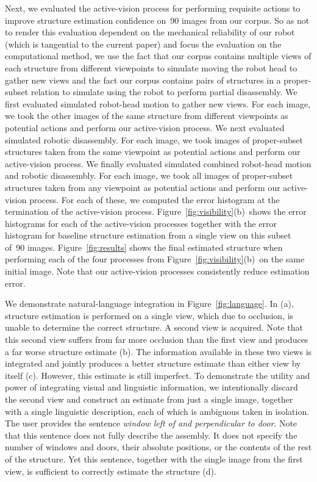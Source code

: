 Next, we evaluated the active-vision process for performing requisite actions
to improve structure estimation confidence on~90 images from our corpus.
%
So as not to render this evaluation dependent on the mechanical reliability of
our robot (which is tangential to the current paper) and focus the evaluation on
the computational method, we use the fact that our corpus contains multiple
views of each structure from different viewpoints to simulate moving the robot
head to gather new views and the fact our corpus contains pairs of structures
in a proper-subset relation to simulate using the robot to perform partial
disassembly.
%
We first evaluated simulated robot-head motion to gather new views.
%
For each image, we took the other images of the same structure from different
viewpoints as potential actions and perform our active-vision process.
%
We next evaluated simulated robotic disassembly.
%
For each image, we took images of proper-subset structures taken from the same
viewpoint as potential actions and perform our active-vision process.
%
We finally evaluated simulated combined robot-head motion and robotic
disassembly.
%
For each image, we took all images of proper-subset structures taken from any
viewpoint as potential actions and perform our active-vision process.
%
For each of these, we computed the error histogram at the termination of the
active-vision process.
%
Figure~\ref{fig:visibility}(b)~shows the error histograms for each of the
active-vision processes together with the error histogram for baseline
structure estimation from a single view on this subset of~90 images.
%
Figure~\ref{fig:results} shows the final estimated structure when performing
each of the four processes from Figure~\ref{fig:visibility}(b)~on the same
initial image.
%
Note that our active-vision processes consistently reduce estimation error.

We demonstrate natural-language integration in Figure~\ref{fig:language}.
%
In (a), structure estimation is performed on a single view, which due to
occlusion, is unable to determine the correct structure.
%
A second view is acquired.
%
Note that this second view suffers from far more occlusion than the first view
and produces a far worse structure estimate (b).
%
The information available in these two views is integrated and jointly produces
a better structure estimate than either view by itself
(c).
%
However, this estimate is still imperfect.
%
To demonstrate the utility and power of integrating visual and linguistic
information, we intentionally discard the second view and construct an estimate
from just a single image, together with a single linguistic description, each of
which is ambiguous taken in isolation.
%
The user provides the sentence \emph{window left of and perpendicular to door}.
%
Note that this sentence does not fully describe the assembly.
%
It does not specify the number of windows and doors, their absolute
positions, or the contents of the rest of the structure.
%
Yet this sentence, together with the single image from the first view, is
sufficient to correctly estimate the structure (d).

